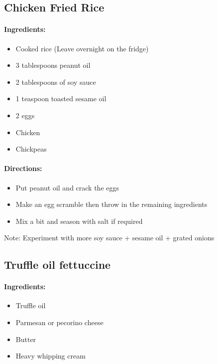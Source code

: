 \documentclass{article}
\begin{document}
\subsection{Chicken Fried Rice}

\paragraph{Ingredients:}

\begin{itemize}
	\item Cooked rice (Leave overnight on the fridge)
	\item 3 tablespoons peanut oil
	\item 2 tablespoons of soy sauce
	\item 1 teaspoon toasted sesame oil
	\item 2 eggs
	\item Chicken
	\item Chickpeas
\end{itemize}

\paragraph{Directions:}
\begin{itemize}
	\item Put peanut oil and crack the eggs
	\item Make an egg scramble then throw in the remaining ingredients
	\item Mix a bit and season with salt if required

\end{itemize}

Note: Experiment with more soy sauce + sesame oil + grated onions

\subsection{Truffle oil fettuccine}

\paragraph{Ingredients:}

\begin{itemize}
	\item Truffle oil 
	\item Parmesan or pecorino cheese 
	\item Butter 
	\item Heavy whipping cream
\end{itemize}
\end{document}
